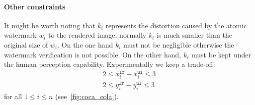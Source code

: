 \documentclass[a4paper,11pt,onecolumn]{memoir}
\begin{document}
\paragraph[Other constraints]{Other constraints}
It might be worth noting that $k_i$ represents the distortion caused by the atomic watermark $w_i$ to the rendered image, normally $k_i$ is much smaller than the original size of $w_i$. On the one hand $k_i$ must not be negligible otherwise the watermark verification is not possible. On the other hand, $k_i$ must be kept under the human perception capability. Experimentally we keep a trade-off:
\begin{align*}
    2 \leq x^{\mathtt{lr}}_{i} - x^{\mathtt{ul}}_{i} \leq 3 \\
    2 \leq y^{\mathtt{lr}}_{i} - y^{\mathtt{ul}}_{i} \leq 3
\end{align*}
for all $1 \leq i \leq n$ (see~\autoref{fig:coca_cola}).
\end{document}
